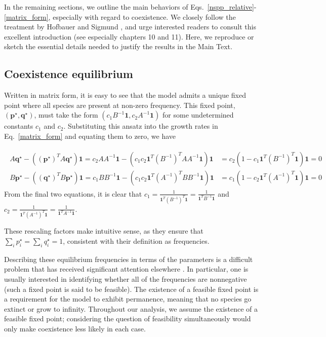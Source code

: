 \documentclass[11pt]{article}
\begin{document}
In the remaining sections, we outline the main behaviors of Eqs.~\ref{nspp_relative}-\ref{matrix_form}, especially with regard to coexistence. We closely follow the treatment by Hofbauer and Sigmund \cite{hofbauer1998evolutionary}, and urge interested readers to consult this excellent introduction (see especially chapters 10 and 11). Here, we reproduce or sketch the essential details needed to justify the results in the Main Text.

\subsection{Coexistence equilibrium}

Written in matrix form, it is easy to see that the model admits a unique fixed point where all species are present at non-zero frequency. This fixed point, $(\bm{p}^\star, \bm{q}^\star)$, must take the form $(c_1 B^{-1} \bm{1}, c_2 A^{-1} \bm{1})$ for some undetermined constants $c_1$ and $c_2$. Substituting this ansatz into the growth rates in Eq.~\ref{matrix_form} and equating them to zero, we have

\begin{align}
	\begin{split}
	A \bm{q}^\star - ((\bm{p}^\star)^T A \bm{q}^\star) \bm{1} = c_2 A A^{-1} \bm{1} - (c_1 c_2 \bm{1}^T  (B^{-1})^T A A^{-1} \bm{1}) \bm{1} &= c_2 (1 - c_1 \bm{1}^T  (B^{-1})^T \bm{1}) \bm{1} = 0 \\
	B \bm{p}^\star - ((\bm{q}^\star)^T B \bm{p}^\star) \bm{1} = c_1 B B^{-1} \bm{1} - (c_1 c_2 \bm{1}^T  (A^{-1})^T B B^{-1} \bm{1}) \bm{1} &= c_1 (1 - c_2 \bm{1}^T  (A^{-1})^T \bm{1}) \bm{1} = 0
	\end{split}
\end{align}
From the final two equations, it is clear that $c_1 = \frac{1}{\bm{1}^T  (B^{-1})^T \bm{1}} = \frac{1}{\bm{1}^T  B^{-1} \bm{1}}$ and $c_2 = \frac{1}{\bm{1}^T  (A^{-1})^T \bm{1}} = \frac{1}{\bm{1}^T  A^{-1} \bm{1}}$.

These rescaling factors make intuitive sense, as they ensure that $\sum_i p^\star_i = \sum_i q^\star_i = 1$, consistent with their definition as frequencies.

Describing these equilibrium frequencies in terms of the parameters is a difficult problem that has received significant attention elsewhere \cite{eppinga2018frequency,mack2019plant,saavedra2017structural,servan2018coexistence,pettersson2020stability,saavedra2021feasibility}. In particular, one is usually interested in identifying whether all of the frequencies are nonnegative (such a fixed point is said to be feasible). The existence of a feasible fixed point is a requirement for the model to exhibit permanence, meaning that no species go extinct or grow to infinity. Throughout our analysis, we assume the existence of a feasible fixed point; considering the question of feasibility simultaneously would only make coexistence less likely in each case.
\end{document}
